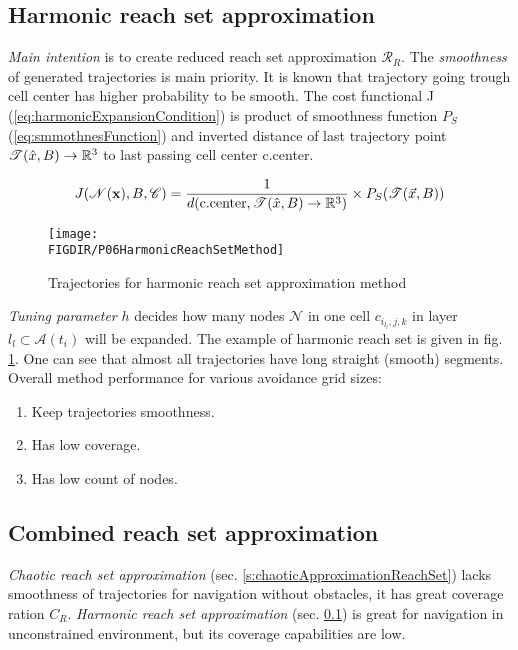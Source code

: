 \subsection{Harmonic reach set approximation}\label{s:harmonicApproximationReachSet}
\noindent \emph{Main intention} is to create reduced reach set approximation $\mathscr{R}_R$. The \emph{smoothness} of generated trajectories is main priority. It is known that trajectory going trough cell center has higher probability to be smooth. The cost functional J (\ref{eq:harmonicExpansionCondition}) is product of smoothness function $P_S$ (\ref{eq:smmothnesFunction}) and inverted distance of last trajectory point $\mathscr{T}(\hat{x},B)\to\mathbb{R}^3$ to last passing cell center c.center. 

\begin{equation}\label{eq:harmonicExpansionCondition}
    J(\mathscr{N}(\textbf{x}),B,\mathscr{C}) =  \frac{1}{d(\text{c.center},\mathscr{T}(\hat{x},B)\to\mathbb{R}^3)}\times P_S(\mathscr{T}(\vec{x},B))
\end{equation}

\begin{figure}[H]
    \centering
    \texttt{[image: \\FIGDIR/P06HarmonicReachSetMethod]}
    \caption{Trajectories for harmonic reach set approximation method}
    \label{fig:P06HarmonicReachSetMethod}
\end{figure}

\noindent \emph{Tuning parameter} $h$ decides how many nodes $\mathscr{N}$ in one cell $c_{i_{l_l},j,k}$ in layer $l_l\subset\mathscr{A}(t_i)$ will be expanded. The example of harmonic reach set is given in fig. \ref{fig:P06HarmonicReachSetMethod}. One can see that almost all trajectories have long straight (smooth) segments. Overall method performance for various avoidance grid sizes:
\begin{enumerate}
    \item Keep trajectories smoothness.
    \item Has low coverage.
    \item Has low count of nodes.
\end{enumerate}

\subsection{Combined reach set approximation}\label{s:combinedReachSetApproximation}
\noindent \emph{Chaotic reach set approximation} (sec. \ref{s:chaoticApproximationReachSet}) lacks smoothness of trajectories for navigation without obstacles, it has great coverage ration $C_R$. \emph{Harmonic reach set approximation} (sec. \ref{s:harmonicApproximationReachSet}) is great for navigation in unconstrained environment, but its coverage capabilities are low.

